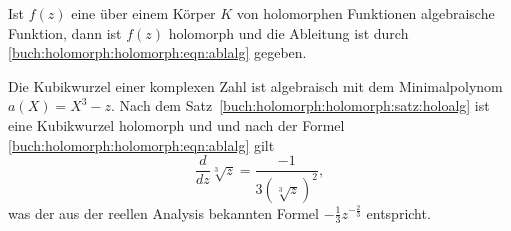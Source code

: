 \begin{satz}
\label{buch:holomorph:holomorph:satz:holoalg}
Ist $f(z)$ eine über einem Körper $K$ von holomorphen Funktionen
algebraische Funktion, dann ist $f(z)$ holomorph und die Ableitung ist
durch
\eqref{buch:holomorph:holomorph:eqn:ablalg}
gegeben.
\end{satz}

\begin{beispiel}
Die Kubikwurzel einer komplexen Zahl ist algebraisch mit dem Minimalpolynom
%
$a(X)=X^3-z$.
Nach dem Satz~\ref{buch:holomorph:holomorph:satz:holoalg} ist eine
Kubikwurzel holomorph und und nach der Formel
\eqref{buch:holomorph:holomorph:eqn:ablalg}
gilt
\[
\frac{d}{dz}
\!\sqrt[3]{z}
=
\frac{-1}{3(\!\sqrt[3]{z})^2},
\]
was der aus der reellen Analysis bekannten Formel $-\frac13z^{-\frac23}$ 
entspricht.
\end{beispiel}

